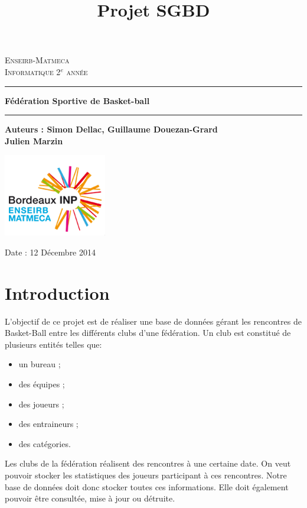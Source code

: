 \documentclass[a4paper,12pt]{article}
\title{Projet SGBD}
\begin{document}
\begin{titlepage}
\thispagestyle{empty}
\begin{sffamily}
  \begin{center}
  \textsc{\LARGE Enseirb-Matmeca}\\[2cm]
  \textsc{\LARGE Informatique 2$^e$ année}\\[2cm]
  \end{center}
  \end{sffamily}
  
\noindent \rule{\textwidth}{0.5pt}
  \begin{center}
  \Huge
  \textbf{Fédération Sportive de Basket-ball}
  \end{center}
\noindent \rule{\textwidth}{0.5pt}

\begin{center}
\textbf{Auteurs : Simon Dellac, Guillaume Douezan-Grard\\ Julien Marzin}
\end{center}
\vspace{2cm}
\begin{center}
\includegraphics[scale=1.1]{logo.png}
\end{center}
\vspace{2cm}

\begin{center}
Date : 12 Décembre 2014
\end{center}

\end{titlepage}

\tableofcontents
\clearpage

\section*{Introduction}
L'objectif de ce projet est de réaliser une base de données gérant les rencontres de Basket-Ball entre les différents clubs d'une fédération. Un club est constitué de plusieurs entités telles que:
\begin{itemize}
\item un bureau ;
\item des équipes ;
\item des joueurs ;
\item des entraineurs ;
\item des catégories.
\end{itemize}
\vspace{0.25cm}
Les clubs de la fédération réalisent des rencontres à une certaine date. On veut pouvoir stocker les statistiques des joueurs participant à ces rencontres. Notre base de données doit donc stocker toutes ces informations. Elle doit également pouvoir être consultée, mise à jour ou détruite.
\end{document}
